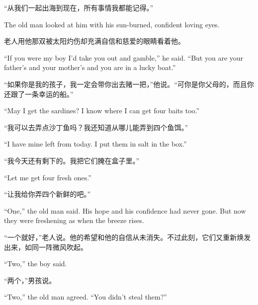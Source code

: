 \begin{paracol}{2}
“从我们一起出海到现在，所有事情我都能记得。”

\switchcolumn*

The old man looked at him with his sun-burned, \gls{confident} loving eyes.

\switchcolumn

老人用他那双被太阳灼伤却充满自信和慈爱的眼睛看着他。

\switchcolumn*

``If you were my boy I'd take you out and \gls{gamble},'' he said. ``But you are your father's and your mother's and you are in a lucky boat.''

\switchcolumn

“如果你是我的孩子，我一定会带你出去赌一把，”他说。“可你是你父母的，而且你还跟了一条幸运的船。”

\switchcolumn*

``May I get the sardines? I know where I can get four \glspl{bait} too.''

\switchcolumn

“我可以去弄点沙丁鱼吗？我还知道从哪儿能弄到四个鱼饵。”

\switchcolumn*

``I have mine left from today. I put them in salt in the box.''

\switchcolumn

“我今天还有剩下的。我把它们腌在盒子里。”

\switchcolumn*

``Let me get four fresh ones.''

\switchcolumn

“让我给你弄四个新鲜的吧。”

\switchcolumn*

``One,'' the old man said. His hope and his \gls{confidence} had never gone. But now they were \gls{freshening} as when the \gls{breeze} \glspl{rise}.

\switchcolumn

“一个就好，”老人说。他的希望和他的自信从未消失。不过此刻，它们又重新焕发出来，如同一阵微风吹起。

\switchcolumn*

``Two,'' the boy said.

\switchcolumn

“两个，”男孩说。

\switchcolumn*

``Two,'' the old man agreed. ``You didn't \gls{steal} them?''

\switchcolumn


\end{paracol}
